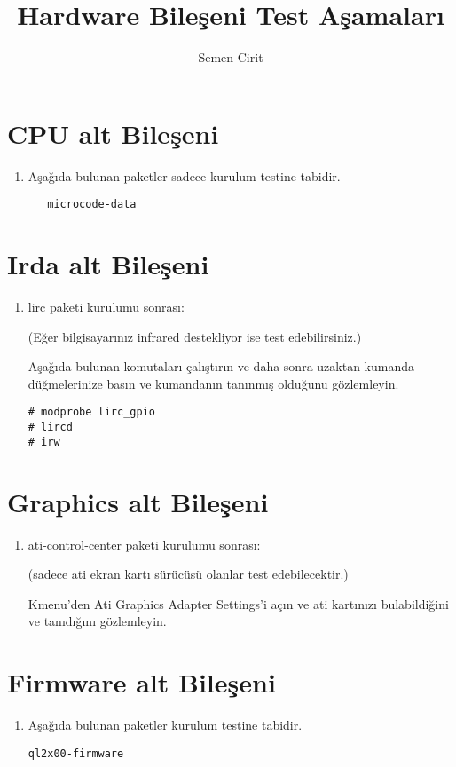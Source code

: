 \documentclass[a4paper,10pt]{article}
\title{Hardware Bileşeni Test Aşamaları}
\author{Semen Cirit}
\begin{document}
\maketitle
\section{CPU alt Bileşeni}
\begin{enumerate}
 \item Aşağıda bulunan paketler sadece kurulum testine tabidir.
  \begin{verbatim}
   microcode-data
  \end{verbatim}

\end{enumerate}

\section{Irda alt Bileşeni}
\begin{enumerate}
 \item lirc paketi kurulumu sonrası:

(Eğer bilgisayarınız infrared destekliyor ise test edebilirsiniz.)

Aşağıda bulunan komutaları çalıştırın ve daha sonra uzaktan kumanda düğmelerinize basın ve kumandanın tanınmış olduğunu gözlemleyin.
\begin{verbatim}
# modprobe lirc_gpio
# lircd
# irw  
\end{verbatim}

\end{enumerate}


\section{Graphics alt Bileşeni}
\begin{enumerate}
 \item ati-control-center paketi kurulumu sonrası:

(sadece ati ekran kartı sürücüsü olanlar test edebilecektir.)
 
Kmenu'den Ati Graphics Adapter Settings'i açın ve ati kartınızı bulabildiğini ve tanıdığını gözlemleyin.
\end{enumerate}

\section{Firmware alt Bileşeni}
\begin{enumerate}
 \item Aşağıda bulunan paketler kurulum testine tabidir.
\begin{verbatim}
ql2x00-firmware
\end{verbatim}
\end{enumerate}
\end{document}
